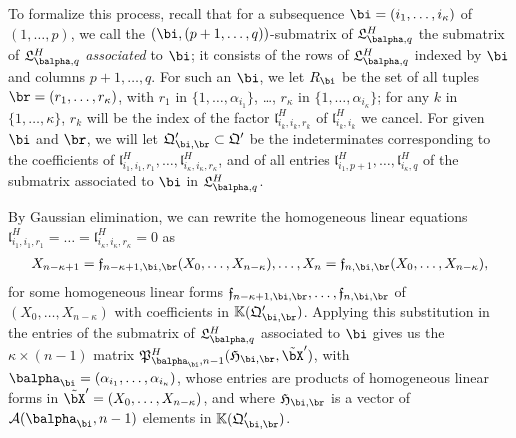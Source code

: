 \documentclass[12pt]{article}
\begin{document}
To formalize this process, recall that for a subsequence
$\bi=(i_1,\dots,i_\kappa)$ of $(1,\dots,p)$, we call the
$(\bi,(p+1,\dots,q))$-submatrix of $\mathfrak{L}^H_{\balpha,q}$ the submatrix of
$\mathfrak{L}^H_{\balpha,q}$ {\em associated} to $\bi$; it consists of the rows of
$\mathfrak{L}^H_{\balpha,q}$ indexed by $\bi$ and columns $p+1,\dots,q$.
For such an $\bi$, we let $R_\bi$ be the set of
all tuples $\br=(r_1,\dots,r_\kappa)$, with $r_1$ in
$\{1,\dots,\alpha_{i_1}\}$, \dots, $r_\kappa$ in
$\{1,\dots,\alpha_{i_\kappa}\}$; for any $k$ in $\{1,\dots,\kappa\}$,
$r_k$ will be the index of the factor $\mathfrak{l}^H_{i_k,i_k,r_k}$
of $\mathfrak{l}^H_{i_k,i_k}$ we cancel. For given $\bi$ and $\br$,
we will let $\mathfrak{Q}'_{\bi,\br} \subset \mathfrak{Q}'$ be the
indeterminates corresponding to the coefficients of
$\mathfrak{l}^H_{i_1,i_1,r_1},\dots,\mathfrak{l}^H_{i_\kappa,i_\kappa,r_\kappa}$, and
of all entries $\mathfrak{l}^H_{i_1,p+1},\dots,\mathfrak{l}^H_{i_\kappa,q}$
of the submatrix associated to $\bi$ in $\mathfrak{L}^H_{\balpha,q}$.

By Gaussian elimination, we can rewrite the homogeneous linear
equations
$\mathfrak{l}^H_{i_1,i_1,r_1}=\dots=\mathfrak{l}^H_{i_\kappa,i_\kappa,r_\kappa}=0$ as
\begin{align}\label{eq:f_sr}
X_{n-\kappa+1}=\mathfrak{f}_{n-\kappa+1,\bi,\br}(X_0,\dots,X_{n-\kappa}),\dots,X_{n}=\mathfrak{f}_{n,\bi,\br}(X_0,\dots,X_{n-\kappa}),  
\end{align}
for some homogeneous linear forms
$\mathfrak{f}_{n-\kappa+1,\bi,\br},\dots,\mathfrak{f}_{n,\bi,\br}$ of
$(X_0,\dots,X_{n-\kappa})$ with coefficients in
$\KK(\mathfrak{Q}'_{\bi,\br})$. Applying this substitution in the
entries of the submatrix of ${\mathfrak{L}^H_{\balpha,q}}$ associated
to $\bi$ gives us the $\kappa \times (n-1)$ matrix
$\mathfrak{P}^H_{\balpha_\bi,n-1}(\mathfrak{H}_{\bi,\br},\tilde\bX')$,
with $\balpha_\bi=(\alpha_{i_1},\dots,\alpha_{i_\kappa})$, whose
entries are products of homogeneous linear forms in
$\tilde\bX'=(X_0,\dots,X_{n-\kappa})$, and where $\mathfrak{H}_{\bi,\br}$ is a
vector of ${\cal A}(\balpha_\bi,n-1)$ elements in $\KK(\mathfrak{Q}'_{\bi,\br})$.
\end{document}
